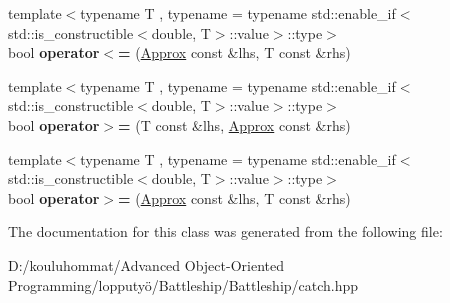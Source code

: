 \begin{DoxyCompactItemize}
\item 
\mbox{\label{class_catch_1_1_detail_1_1_approx_a6040b908588745570847d7ae8483b091}} 
{\footnotesize template$<$typename T , typename  = typename std\+::enable\+\_\+if$<$std\+::is\+\_\+constructible$<$double, T$>$\+::value$>$\+::type$>$ }\\bool {\bfseries operator$<$=} (\mbox{\hyperlink{class_catch_1_1_detail_1_1_approx}{Approx}} const \&lhs, T const \&rhs)
\item 
\mbox{\label{class_catch_1_1_detail_1_1_approx_affd27efc62be386daeecb7a09e828d44}} 
{\footnotesize template$<$typename T , typename  = typename std\+::enable\+\_\+if$<$std\+::is\+\_\+constructible$<$double, T$>$\+::value$>$\+::type$>$ }\\bool {\bfseries operator$>$=} (T const \&lhs, \mbox{\hyperlink{class_catch_1_1_detail_1_1_approx}{Approx}} const \&rhs)
\item 
\mbox{\label{class_catch_1_1_detail_1_1_approx_a5899b8a36725406701e2ebded2971ee6}} 
{\footnotesize template$<$typename T , typename  = typename std\+::enable\+\_\+if$<$std\+::is\+\_\+constructible$<$double, T$>$\+::value$>$\+::type$>$ }\\bool {\bfseries operator$>$=} (\mbox{\hyperlink{class_catch_1_1_detail_1_1_approx}{Approx}} const \&lhs, T const \&rhs)
\end{DoxyCompactItemize}


The documentation for this class was generated from the following file\+:\begin{DoxyCompactItemize}
\item 
D\+:/kouluhommat/\+Advanced Object-\/\+Oriented Programming/lopputyö/\+Battleship/\+Battleship/catch.\+hpp\end{DoxyCompactItemize}
